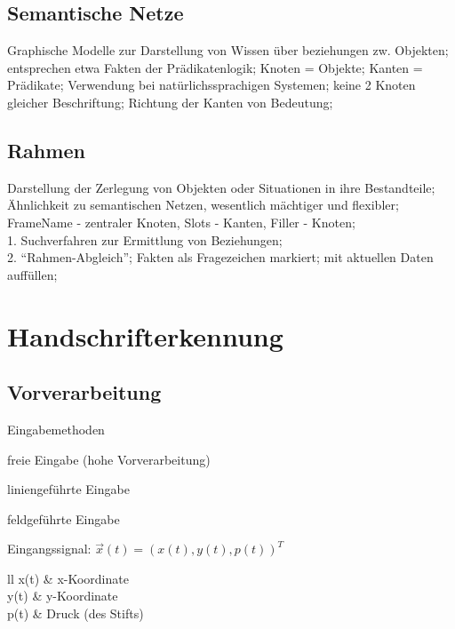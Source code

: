 \documentclass[german,color,6pt]{latex4ei/latex4ei_sheet}
\begin{document}
\begin{sectionbox}
\subsection{Semantische Netze}
Graphische Modelle zur Darstellung von Wissen über beziehungen zw. Objekten; entsprechen etwa Fakten der Prädikatenlogik; Knoten = Objekte; Kanten = Prädikate; Verwendung bei natürlichssprachigen Systemen; keine 2 Knoten gleicher Beschriftung; Richtung der Kanten von Bedeutung;
\end{sectionbox}

\begin{sectionbox}
\subsection{Rahmen}
Darstellung der Zerlegung von Objekten oder Situationen in ihre Bestandteile; Ähnlichkeit zu semantischen Netzen, wesentlich mächtiger und flexibler; FrameName - zentraler Knoten, Slots - Kanten, Filler - Knoten; \\
1. Suchverfahren zur Ermittlung von Beziehungen; \\
2. "`Rahmen-Abgleich"'; Fakten als Fragezeichen markiert; mit aktuellen Daten auffüllen;
\end{sectionbox}

\section{Handschrifterkennung}

\begin{sectionbox}
	\subsection{Vorverarbeitung}
		\begin{cookbox}{Eingabemethoden}
			\item freie Eingabe (hohe Vorverarbeitung)
			\item liniengeführte Eingabe
			\item feldgeführte Eingabe
		\end{cookbox}
	Eingangssignal: $\vec x(t) = (x(t), y(t), p(t))^T$\\
	\begin{tablebox}{ll}
		x(t) & x-Koordinate\\
		y(t) & y-Koordinate\\
		p(t) & Druck (des Stifts)\\
	\end{tablebox}
\end{sectionbox}
\end{document}

